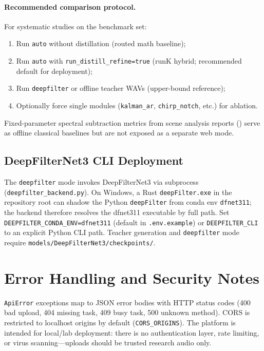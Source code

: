 \paragraph{Recommended comparison protocol.}
For systematic studies on the benchmark set:
\begin{enumerate}
  \item Run \texttt{auto} without distillation (routed math baseline);
  \item Run \texttt{auto} with \texttt{run\_distill\_refine=true} (runK hybrid; recommended default for deployment);
  \item Run \texttt{deepfilter} or offline teacher WAVs (upper-bound reference);
  \item Optionally force single modules (\texttt{kalman\_ar}, \texttt{chirp\_notch}, etc.) for ablation.
\end{enumerate}
Fixed-parameter spectral subtraction metrics from scene analysis reports () serve as offline classical baselines but are not exposed as a separate web mode.

\subsection{DeepFilterNet3 CLI Deployment}
\label{sec:deepfilter_deploy}

The \texttt{deepfilter} mode invokes DeepFilterNet3 via subprocess (\texttt{deepfilter\_backend.py}). On Windows, a Rust \texttt{deepFilter.exe} in the repository root can shadow the Python \texttt{deepFilter} from conda env \texttt{dfnet311}; the backend therefore resolves the dfnet311 executable by full path. Set \texttt{DEEPFILTER\_CONDA\_ENV=dfnet311} (default in \texttt{.env.example}) or \texttt{DEEPFILTER\_CLI} to an explicit Python CLI path. Teacher generation and \texttt{deepfilter} mode require \texttt{models/DeepFilterNet3/checkpoints/}.

\section{Error Handling and Security Notes}
\label{sec:web_errors}

\texttt{ApiError} exceptions map to JSON error bodies with HTTP status codes (400 bad upload, 404 missing task, 409 busy task, 500 unknown method). CORS is restricted to localhost origins by default (\texttt{CORS\_ORIGINS}). The platform is intended for local/lab deployment: there is no authentication layer, rate limiting, or virus scanning---uploads should be trusted research audio only.

